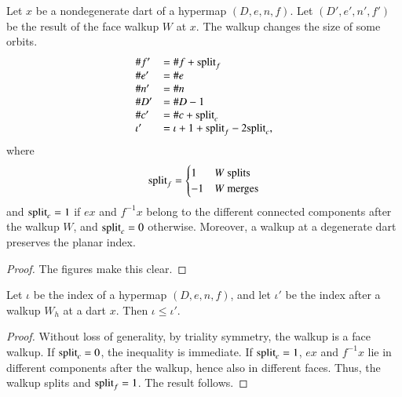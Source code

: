 \begin{lemma} 
Let $x$ be a nondegenerate dart of a hypermap $(D,e,n,f)$. Let
$(D',e',n',f')$ be the result of the face walkup $W$ at $x$.  The
walkup changes the size of some orbits.
\begin{displaymath}
\begin{array}{lll}
\# f' &=\# f +{\operatorname{split}}_f  \\  
\# e'&=\# e \\
\# n'&=\# n \\
\# D'&=\# D - 1 \\
\#c'&=\# c + {\operatorname{split}}_c\\
\iota' &= \iota + 1+{\operatorname{split}}_f - 2{\operatorname{split}}_c,\\
\end{array}
\end{displaymath}
where
\begin{displaymath}
{\operatorname{split}}_f = \begin{cases}
1 & W \text{ splits }\\
-1 & W \text{ merges}\\
\end{cases}
\end{displaymath}
and ${\operatorname{split}}_c=1$ if $e x$ and $f^{-1} x$ belong to the different
connected components after the walkup $W$, and ${\operatorname{split}}_c=0$
otherwise. Moreover, a walkup at a degenerate dart preserves the
planar index.  %
%
%
\end{lemma}

\begin{proof} The figures make this clear.
\end{proof}

\begin{lemma}
Let $\iota$ be the index of a hypermap $(D,e,n,f)$, and let $\iota'$
be the index after a walkup $W_h$ at a dart $x$.  Then $\iota \le
\iota'$.
\end{lemma} 


\begin{proof} Without loss of generality, by triality symmetry, the
walkup is a face walkup.  If ${\operatorname{split}}_c=0$, the inequality is
immediate.  If ${\operatorname{split}}_c=1$, $e x$ and $f^{-1} x$ lie in
different components after the walkup, hence also in different
faces.  Thus, the walkup splits and ${\operatorname{split}}_f = 1$.  The result
follows.
\end{proof}


